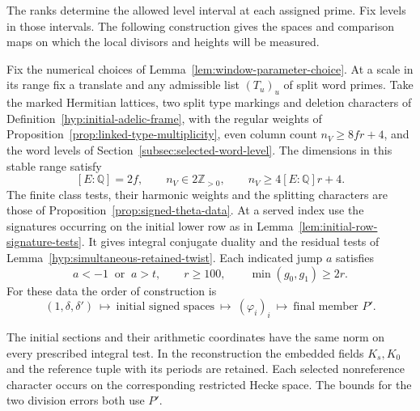 The ranks determine the allowed level interval at each assigned prime.
Fix levels in those intervals. The following construction gives the
spaces and comparison maps on which the local divisors and heights
will be measured.

\begin{rowconstruction}
\label{hyp:family-prescribed-realization}
Fix the numerical choices of Lemma~\ref{lem:window-parameter-choice}.
At a scale in its range fix a translate and any admissible list
\((T_u)_u\) of split word primes. Take the marked Hermitian lattices,
two split type markings and deletion characters of
Definition~\ref{hyp:initial-adelic-frame}, with the regular weights
of Proposition~\ref{prop:linked-type-multiplicity}, even column
count \(n_V\ge8fr+4\), and the word levels of
Section~\ref{subsec:selected-word-level}. The dimensions in this stable range satisfy
\[
        [E:\mathbb Q]=2f,\qquad n_V\in2\mathbb Z_{>0},
                     \qquad n_V\ge 4[E:\mathbb Q]r+4 .
\]
The finite class tests, their harmonic weights and the splitting characters are those of
Proposition~\ref{prop:signed-theta-data}.
At a served index use the signatures occurring on the initial lower row as in Lemma~\ref{lem:initial-row-signature-tests}. It gives integral conjugate duality and the residual tests of Lemma~\ref{hyp:simultaneous-retained-twist}. Each indicated jump \(a\) satisfies
\[
       a<-1\ \text{ or }\ a>t,\qquad r\ge100,\qquad
                                     \min(g_0,g_1)\ge2r .
\]
For these data the order of construction is
\[
 (1,\delta,\delta')\ \longmapsto\
   \text{initial signed spaces}\ \longmapsto\ (\varphi_i)_i
     \ \longmapsto\ \text{final member }P'.
\]

The initial sections and their arithmetic coordinates have the same
norm on every prescribed integral test. In the reconstruction the
embedded fields \(K_s,K_0\) and the reference tuple with its periods
are retained. Each selected nonreference character occurs on the
corresponding restricted Hecke space. The bounds for the two
division errors both use \(P'\).
\end{rowconstruction}

